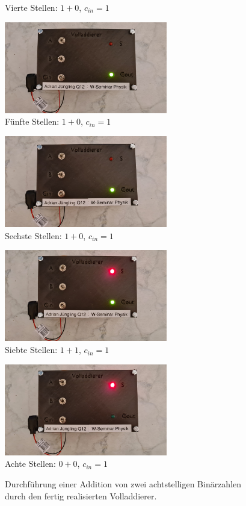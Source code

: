 \begin{figure}[h!]
\begin{minipage}{.5\textwidth}
		Vierte Stellen: $1 + 0$, $c_{in}=1$
		\vspace{.5cm}
	\end{minipage}
	\begin{minipage}{.5\textwidth}
		\centering
		\includegraphics[height=4cm, keepaspectratio]{./Fotos/FA-4.jpg}\\
		Fünfte Stellen: $1 + 0$, $c_{in}=1$
		\vspace{.5cm}
	\end{minipage}%
	\begin{minipage}{.5\textwidth}
		\centering
		\includegraphics[height=4cm, keepaspectratio]{./Fotos/FA-5.jpg}\\
		Sechste Stellen: $1 + 0$, $c_{in}=1$
		\vspace{.5cm}
	\end{minipage}
	\begin{minipage}{.5\textwidth}
		\centering
		\includegraphics[height=4cm, keepaspectratio]{./Fotos/FA-6.jpg}\\
		Siebte Stellen: $1 + 1$, $c_{in}=1$
	\end{minipage}%
	\begin{minipage}{.5\textwidth}
		\centering
		\includegraphics[height=4cm, keepaspectratio]{./Fotos/FA-7.jpg}\\
		Achte Stellen: $0 + 0$, $c_{in}=1$
	\end{minipage}
	\caption{Durchführung einer Addition von zwei achtstelligen Binärzahlen durch den fertig realisierten Volladdierer.}
\end{figure}

